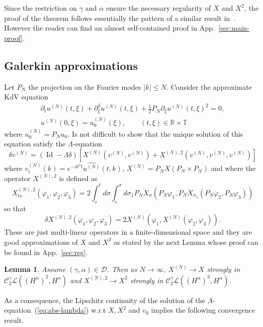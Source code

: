 \documentclass[a4paper,11pt,reqno]{article}
\newcommand{\der}{\delta}
\newcommand{\RR}{\mathbb{R}}
\newcommand{\TT}{\mathbb{T}}
\newcommand{\CC}{\mathcal{C}}
\newcommand{\DD}{\mathcal{D}}
\newcommand{\LL}{\mathcal{L}}
\newcommand{\wh}{\widehat}
\DeclareMathOperator{\id}{\text{Id}}
\newtheorem{lemma}[theorem]{Lemma}
\begin{document}
Since the restriction on $\gamma$ and $\alpha$ ensure the necessary regularity of $X$ and $X^2$, the proof of the theorem
follows essentially the pattern of a similar result
in~\cite{MR2091358}. However the reader can find an almost self-contained proof in
App.~\ref{sec:main-proof}. 

\subsection{Galerkin approximations}
\label{sec:galerkin}
Let $P_N$ the projection on the Fourier modes $|k| \le N$. Consider the approximate KdV equation
\begin{multline}
  \label{eq:kdv-real-N}
\partial_t u^{(N)}(t,\xi) + \partial^3_\xi u^{(N)}(t,\xi) +
\frac12 P_N \partial_\xi u^{(N)}(t,\xi)^2 = 0,\\ u^{(N)}(0,\xi) = u^{(N)}_0(\xi), \qquad
(t,\xi)\in\RR\times \TT  
\end{multline}
where $u^{(N)}_0 = P_N u_0$. Is not difficult to show that the unique solution of this equation satisfy the $\Lambda$-equation
\begin{equation}
  \label{eq:abs-step-2-compact-N}
\der v^{(N)} = (\id - \Lambda \der)[X^{(N)}(v^{(N)},v^{(N)})+X^{(N),2}(v^{(N)},v^{(N)},v^{(N)})]
\end{equation}
where $v^{(N)}_t(k) = e^{-ik^3 t}\wh{u^{(N)}}(t,k)$,
$X^{(N)} = P_N X ( P_N \times P_N )$ and where the operator $X^{(N),2}$ is defined as
\begin{equation}
  \label{eq:X2-galerkin}
X^{(N),2}_{ts}(\varphi_1,\varphi_2,\varphi_3) = 2 \int_s^t d\sigma \int_s^\sigma d\sigma_1 P_N \dot X_\sigma(P_N \varphi_1,P_N \dot X_{\sigma_1}(P_N \varphi_2,P_N \varphi_3))  
\end{equation}
so that 
$$
\der X^{(N),2}(\varphi_1,\varphi_2,\varphi_3) = 2 X^{(N)}(\varphi_1,X^{(N)}(\varphi_2,\varphi_3)).
$$
These are just multi-linear operators in
a finite-dimensional space and they are good approximations of $X$ and
$X^2$ as stated by the next Lemma whose proof can be found in App.~\ref{sec:reg}.

\begin{lemma}
\label{lemma:gal}
Assume $(\gamma,\alpha) \in \DD$. Then as  $N \to \infty$, $X^{(N)} \to X$ strongly in $\CC_2^\gamma
\LL((H^\alpha)^2,H^\alpha)$ and $X^{(N),2} \to X^2$ strongly in $\CC_2^\gamma
\LL((H^\alpha)^3,H^\alpha)$. 
\end{lemma}

As a consequence, the Lipschitz continuity of the solution of the
$\Lambda$-equation~(\ref{eq:abs-lambda}) w.r.t $X,X^2$ and $v_0$ implies
the following convergence result.
\end{document}
